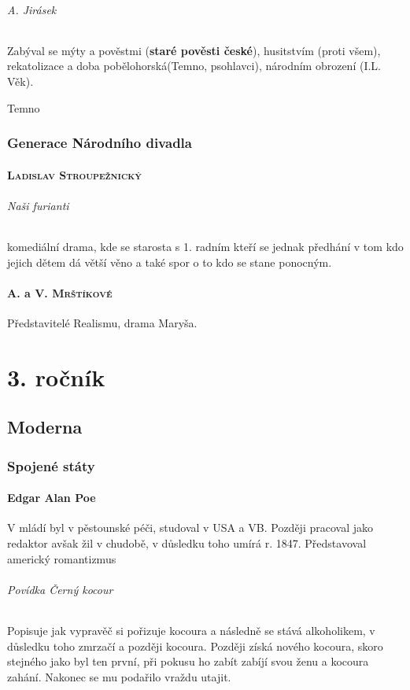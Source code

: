 \documentclass[10pt,a4page,headings,openany,%
oneside
,twocolumn
]{report}
\begin{document}
\paragraph{A. Jirásek} Zabýval se mýty a pověstmi (\textbf{staré pověsti české}), husitstvím (proti všem), rekatolizace a doba pobělohorská(Temno, psohlavci), národním obrození (I.L. Věk).
\subparagraph{Temno} 
 
 
\section[Národní divadlo]{Generace Národního divadla}
\subsection{\textsc{Ladislav Stroupežnický}}
\paragraph{Naši furianti} komediální drama, kde se starosta s 1. radním kteří se jednak předhání v tom kdo jejich dětem dá větší věno a také spor o to kdo se stane ponocným.

\subsection{\textsc{A. }a\textsc{ V. Mrštíkové}}
Představitelé Realismu, drama Maryša.


\part{3. ročník}
\chapter{Moderna}
\section{Spojené státy}
\subsection[E. A. Poe]{Edgar Alan Poe}

V mládí byl v pěstounské péči, studoval v USA a VB. Později pracoval jako redaktor avšak žil v chudobě, v důsledku toho umírá r. 1847. Představoval americký romantizmus

\paragraph{Povídka Černý kocour} Popisuje jak vypravěč si pořizuje kocoura a následně se stává alkoholikem, v důsledku toho zmrzačí a později kocoura. Později získá nového kocoura, skoro stejného jako byl ten první, při pokusu ho zabít zabíjí svou ženu a kocoura zahání. Nakonec se mu podařilo vraždu utajit.
\end{document}
